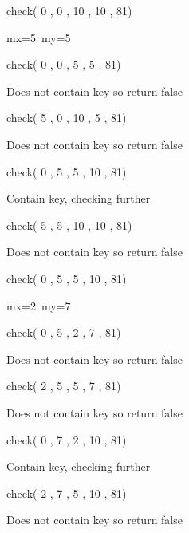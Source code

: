 \documentclass[14pt]{article}
\renewcommand{\_}{\kern-1.5pt\textunderscore\kern-1.5pt}
\begin{document}
\begin{multicols}{2}
\begin{enumerate}
\vspace{\baselineskip}
\begin{justify}
check( 0 , 0 , 10 , 10 , 81)
\end{justify}
\begin{justify}
mx=5\  my=5
\end{justify}
\begin{justify}
check( 0 , 0 , 5 , 5 , 81) 
\end{justify}
\begin{justify}
Does not contain key so return false
\end{justify}
\begin{justify}
check( 5 , 0 , 10 , 5 , 81) 
\end{justify}
\begin{justify}
Does not contain key so return false
\end{justify}
\begin{justify}
check( 0 , 5 , 5 , 10 , 81) 
\end{justify}
\begin{justify}
Contain key, checking further
\end{justify}
\begin{justify}
check( 5 , 5 , 10 , 10 , 81)
\end{justify}
\begin{justify}
Does not contain key so return false
\end{justify}

\vspace{\baselineskip}
\begin{justify}
check( 0 , 5 , 5 , 10 , 81) 
\end{justify}
\begin{justify}
mx=2\  my=7
\end{justify}
\begin{justify}
check( 0 , 5 , 2 , 7 , 81) 
\end{justify}
\begin{justify}
Does not contain key so return false
\end{justify}
\begin{justify}
check( 2 , 5 , 5 , 7 , 81) 
\end{justify}
\begin{justify}
Does not contain key so return false
\end{justify}
\begin{justify}
check( 0 , 7 , 2 , 10 , 81) 
\end{justify}
\begin{justify}
Contain key, checking further
\end{justify}
\begin{justify}
check( 2 , 7 , 5 , 10 , 81) 
\end{justify}
\begin{justify}
Does not contain key so return false
\end{justify}


\end{enumerate}
\end{multicols}
\end{document}
